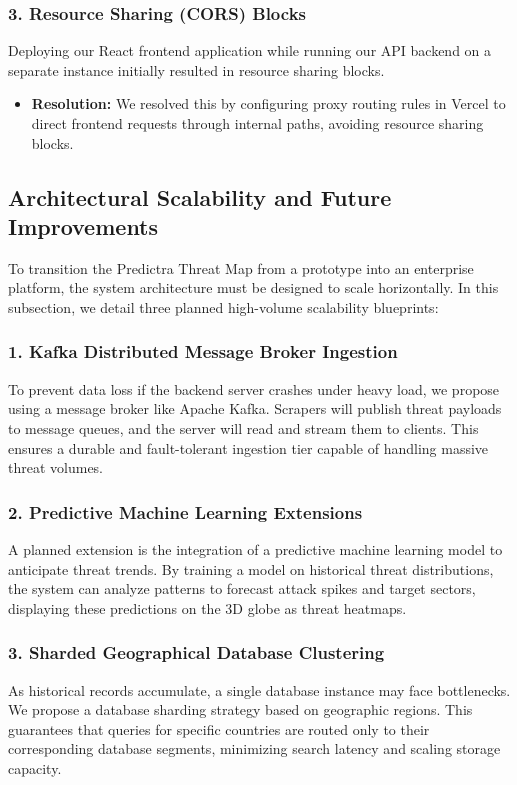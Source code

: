 \subsubsection{3. Resource Sharing (CORS) Blocks}
Deploying our React frontend application while running our API backend on a separate instance initially resulted in resource sharing blocks.
\begin{itemize}
    \item \textbf{Resolution:} We resolved this by configuring proxy routing rules in Vercel to direct frontend requests through internal paths, avoiding resource sharing blocks.
\end{itemize}

\subsection{Architectural Scalability and Future Improvements}
To transition the Predictra Threat Map from a prototype into an enterprise platform, the system architecture must be designed to scale horizontally. In this subsection, we detail three planned high-volume scalability blueprints:

\subsubsection{1. Kafka Distributed Message Broker Ingestion}
To prevent data loss if the backend server crashes under heavy load, we propose using a message broker like Apache Kafka. Scrapers will publish threat payloads to message queues, and the server will read and stream them to clients. This ensures a durable and fault-tolerant ingestion tier capable of handling massive threat volumes.

\subsubsection{2. Predictive Machine Learning Extensions}
A planned extension is the integration of a predictive machine learning model to anticipate threat trends. By training a model on historical threat distributions, the system can analyze patterns to forecast attack spikes and target sectors, displaying these predictions on the 3D globe as threat heatmaps.

\subsubsection{3. Sharded Geographical Database Clustering}
As historical records accumulate, a single database instance may face bottlenecks. We propose a database sharding strategy based on geographic regions. This guarantees that queries for specific countries are routed only to their corresponding database segments, minimizing search latency and scaling storage capacity.

